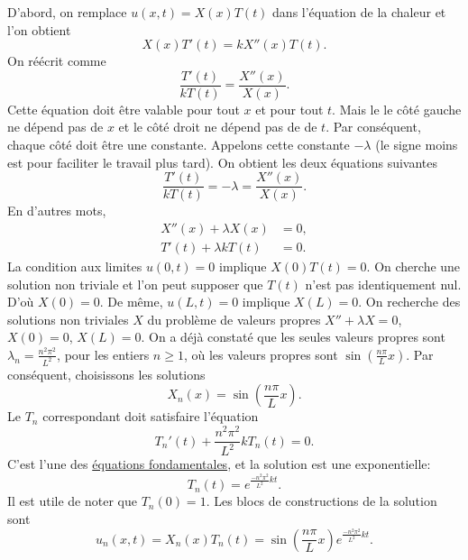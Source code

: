 D'abord, on remplace $u(x, t) = X(x)T(t)$ dans l'équation de la chaleur et l'on obtient
\begin{equation*}
X(x)T'(t) = k X''(x)T(t) .
\end{equation*}
On réécrit comme
\begin{equation*}
\frac{T'(t)}{k T(t)} =
\frac{X''(x)}{X(x)} .
\end{equation*}
Cette équation doit être valable pour tout $ x $ et pour tout $ t $.  Mais le
le côté gauche ne dépend pas de $ x $ et le côté droit ne dépend pas de
de $ t $.  Par conséquent,  chaque côté doit être une constante.  Appelons cette
constante $-\lambda$ (le signe moins est pour faciliter le travail plus tard).
On obtient les deux équations suivantes
\begin{equation*}
\frac{T'(t)}{k T(t)} = -\lambda =
\frac{X''(x)}{X(x)} .
\end{equation*}
En d'autres mots,
\begin{align*}
X''(x) + \lambda X(x) &= 0 , \\
T'(t) + \lambda k T(t) &= 0 .
\end{align*}
La condition aux limites $ u (0, t) = 0 $ implique $ X (0) T (t) = 0 $.  On cherche
une solution non triviale et l'on peut supposer que $ T (t) $ n'est pas identiquement nul.  D'où $ X (0) = 0 $.  De même, $ u (L, t) = 0 $ implique $ X (L) = 0 $.  On
recherche des solutions non triviales $ X $ du problème de valeurs propres
$X'' + \lambda X = 0$, $X(0) = 0$, $X(L) = 0$.  
On a déjà constaté que les seules valeurs propres sont $\lambda_n = \frac{n^2 \pi^2}{L^2}$,  pour les entiers 
$n \geq 1$,
où les valeurs propres sont $\sin \left(\frac{n \pi}{L} x\right)$.  Par conséquent, choisissons
les solutions
\begin{equation*}
X_n (x) = \sin \left(\frac{n \pi}{L} x \right) .
\end{equation*}
Le $ T_n $ correspondant doit satisfaire l'équation
\begin{equation*}
T_n'(t) + \frac{n^2 \pi^2}{L^2} k T_n(t) = 0 .
\end{equation*}
C'est l'une des
\hyperref[subsection:fourfundamental]{équations fondamentales},
et la solution est une exponentielle:
\begin{equation*}
T_n(t) = e^{\frac{-n^2 \pi^2}{L^2} k t} .
\end{equation*}
Il est utile de noter que $T_n(0) = 1$.
Les blocs de constructions de la solution sont
\begin{equation*}
u_n(x,t) = X_n(x)T_n(t) =
\sin \left( \frac{n \pi}{L} x \right)
e^{\frac{-n^2 \pi^2}{L^2} k t} .
\end{equation*}

